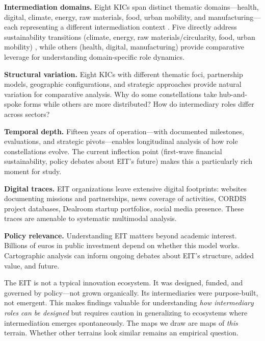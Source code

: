 \documentclass[../main.tex]{subfiles}
\begin{document}
\textbf{Intermediation domains.} Eight KICs span distinct thematic domains---health, digital, climate, energy, raw materials, food, urban mobility, and manufacturing---each representing a different intermediation context \cite{jacobides2018ecosystems}. Five directly address sustainability transitions (climate, energy, raw materials/circularity, food, urban mobility) , while others (health, digital, manufacturing) provide comparative leverage for understanding domain-specific role dynamics.

\textbf{Structural variation.} Eight KICs with different thematic foci, partnership models, geographic configurations, and strategic approaches provide natural variation for comparative analysis. Why do some constellations take hub-and-spoke forms while others are more distributed? How do intermediary roles differ across sectors?

\textbf{Temporal depth.} Fifteen years of operation---with documented milestones, evaluations, and strategic pivots---enables longitudinal analysis of how role constellations evolve. The current inflection point (first-wave financial sustainability, policy debates about EIT's future) makes this a particularly rich moment for study.

\textbf{Digital traces.} EIT organizations leave extensive digital footprints: websites documenting missions and partnerships, news coverage of activities, CORDIS project databases, Dealroom startup portfolios, social media presence. These traces are amenable to systematic multimodal analysis.

\textbf{Policy relevance.} Understanding EIT matters beyond academic interest. Billions of euros in public investment depend on whether this model works. Cartographic analysis can inform ongoing debates about EIT's structure, added value, and future.

\begin{insightbox}
The EIT is not a typical innovation ecosystem. It was designed, funded, and governed by policy---not grown organically. Its intermediaries were purpose-built, not emergent. This makes findings valuable for understanding \emph{how intermediary roles can be designed} but requires caution in generalizing to ecosystems where intermediation emerges spontaneously. The maps we draw are maps of \emph{this} terrain. Whether other terrains look similar remains an empirical question.
\end{insightbox}
\end{document}
